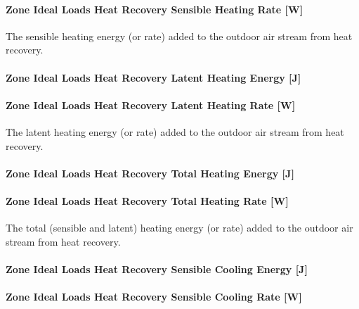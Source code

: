 \paragraph{Zone Ideal Loads Heat Recovery Sensible Heating Rate {[}W{]}}\label{zone-ideal-loads-heat-recovery-sensible-heating-rate-w}

The sensible heating energy (or rate) added to the outdoor air stream from heat recovery.

\paragraph{Zone Ideal Loads Heat Recovery Latent Heating Energy {[}J{]}}\label{zone-ideal-loads-heat-recovery-latent-heating-energy-j}

\paragraph{Zone Ideal Loads Heat Recovery Latent Heating Rate {[}W{]}}\label{zone-ideal-loads-heat-recovery-latent-heating-rate-w}

The latent heating energy (or rate) added to the outdoor air stream from heat recovery.

\paragraph{Zone Ideal Loads Heat Recovery Total Heating Energy {[}J{]}}\label{zone-ideal-loads-heat-recovery-total-heating-energy-j}

\paragraph{Zone Ideal Loads Heat Recovery Total Heating Rate {[}W{]}}\label{zone-ideal-loads-heat-recovery-total-heating-rate-w}

The total (sensible and latent) heating energy (or rate) added to the outdoor air stream from heat recovery.

\paragraph{Zone Ideal Loads Heat Recovery Sensible Cooling Energy {[}J{]}}\label{zone-ideal-loads-heat-recovery-sensible-cooling-energy-j}

\paragraph{Zone Ideal Loads Heat Recovery Sensible Cooling Rate {[}W{]}}\label{zone-ideal-loads-heat-recovery-sensible-cooling-rate-w}

